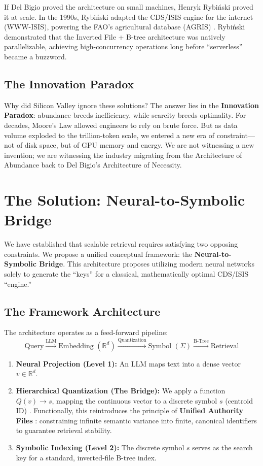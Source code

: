 \documentclass[manuscript,screen,nonacm]{acmart}
\begin{document}
If Del Bigio proved the architecture on small machines, Henryk Rybiński proved it at scale. In the 1990s, Rybiński adapted the CDS/ISIS engine for the internet (WWW-ISIS), powering the FAO's agricultural database (AGRIS) \cite{rybinski1999}. Rybiński demonstrated that the Inverted File + B-tree architecture was natively parallelizable, achieving high-concurrency operations long before ``serverless'' became a buzzword.

\subsection{The Innovation Paradox}

Why did Silicon Valley ignore these solutions? The answer lies in the \textbf{Innovation Paradox}: abundance breeds inefficiency, while scarcity breeds optimality. For decades, Moore's Law allowed engineers to rely on brute force. But as data volume exploded to the trillion-token scale, we entered a new era of constraint---not of disk space, but of GPU memory and energy. We are not witnessing a new invention; we are witnessing the industry migrating from the Architecture of Abundance back to Del Bigio's Architecture of Necessity.

\section{The Solution: Neural-to-Symbolic Bridge}

We have established that scalable retrieval requires satisfying two opposing constraints. We propose a unified conceptual framework: the \textbf{Neural-to-Symbolic Bridge}. This architecture proposes utilizing modern neural networks solely to generate the ``keys'' for a classical, mathematically optimal CDS/ISIS ``engine.''

\subsection{The Framework Architecture}

The architecture operates as a feed-forward pipeline:
\[ \text{Query} \xrightarrow{\text{LLM}} \text{Embedding } (\mathbb{R}^d) \xrightarrow{\text{Quantization}} \text{Symbol } (\Sigma) \xrightarrow{\text{B-Tree}} \text{Retrieval} \]

\begin{enumerate}
    \item \textbf{Neural Projection (Level 1):} An LLM maps text into a dense vector $v \in \mathbb{R}^d$.
    \item \textbf{Hierarchical Quantization (The Bridge):} We apply a function $Q(v) \rightarrow s$, mapping the continuous vector to a discrete symbol $s$ (centroid ID) \cite{zandieh2025}. Functionally, this reintroduces the principle of \textbf{Unified Authority Files} \cite{caprazli2003}: constraining infinite semantic variance into finite, canonical identifiers to guarantee retrieval stability.
    \item \textbf{Symbolic Indexing (Level 2):} The discrete symbol $s$ serves as the search key for a standard, inverted-file B-tree index.
\end{enumerate}
\end{document}

